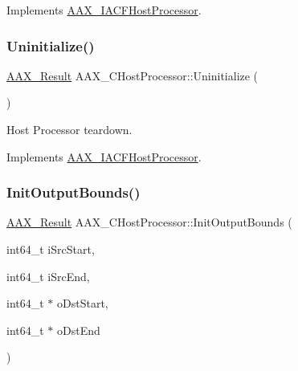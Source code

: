 Implements \mbox{\hyperlink{a01693_a00aa7da380e86cd79c6b8da1aa51c3b7}{A\+A\+X\+\_\+\+I\+A\+C\+F\+Host\+Processor}}.

\mbox{\label{a01485_a0152f823c0f40fb55230ee4cde0dac68}} 
\subsubsection{\texorpdfstring{Uninitialize()}{Uninitialize()}}
{\footnotesize\ttfamily \mbox{\hyperlink{a00392_a4d8f69a697df7f70c3a8e9b8ee130d2f}{A\+A\+X\+\_\+\+Result}} A\+A\+X\+\_\+\+C\+Host\+Processor\+::\+Uninitialize (\begin{DoxyParamCaption}{ }\end{DoxyParamCaption})\hspace{0.3cm}{\ttfamily [virtual]}}



Host Processor teardown. 



Implements \mbox{\hyperlink{a01693_a238fc3fee9180cd52df2c87180f4a656}{A\+A\+X\+\_\+\+I\+A\+C\+F\+Host\+Processor}}.

\mbox{\label{a01485_a8beff35a046a1b3c780b1ecc1ded7e6e}} 
\subsubsection{\texorpdfstring{InitOutputBounds()}{InitOutputBounds()}}
{\footnotesize\ttfamily \mbox{\hyperlink{a00392_a4d8f69a697df7f70c3a8e9b8ee130d2f}{A\+A\+X\+\_\+\+Result}} A\+A\+X\+\_\+\+C\+Host\+Processor\+::\+Init\+Output\+Bounds (\begin{DoxyParamCaption}\item[{int64\+\_\+t}]{i\+Src\+Start,  }\item[{int64\+\_\+t}]{i\+Src\+End,  }\item[{int64\+\_\+t $\ast$}]{o\+Dst\+Start,  }\item[{int64\+\_\+t $\ast$}]{o\+Dst\+End }\end{DoxyParamCaption})\hspace{0.3cm}{\ttfamily [virtual]}}



